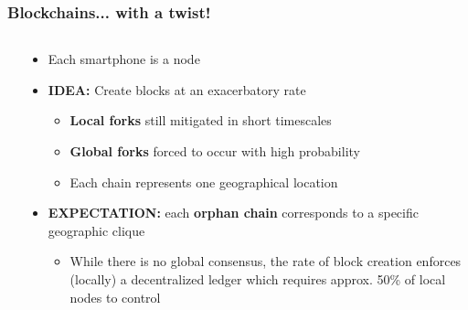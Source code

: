 \documentclass{beamer}
\begin{document}
\begin{frame}
	\frametitle{Blockchains... with a twist!}
	\begin{columns}
		\begin{column}{0.3\textwidth}
			\hfil
		\end{column}

		\begin{column}{0.7\textwidth}
			\begin{itemize}
				\item Each smartphone is a node
				\item \textbf{IDEA:} Create blocks at an exacerbatory rate
				\begin{itemize}
					\item \textbf{Local forks} still mitigated in short timescales
					\item \textbf{Global forks} forced to occur with high probability
					\item Each chain represents one geographical location
				\end{itemize}
				\item \textbf{EXPECTATION:} each \textbf{orphan chain} corresponds to a specific geographic clique
				\begin{itemize}
					\item While there is no global consensus, the rate of block creation enforces (locally) a decentralized ledger which requires approx. 50\% of local nodes to control
				\end{itemize}
			\end{itemize}
		\end{column}
	\end{columns}
\end{frame}
\end{document}

